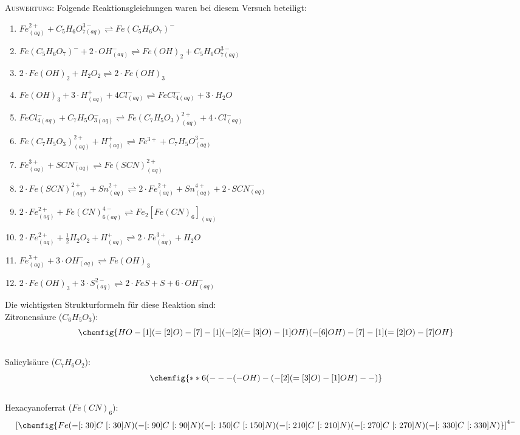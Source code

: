 \documentclass[11pt, a4paper]{article}
\begin{document}
\textsc{Auswertung:}\hspace{8mm} Folgende Reaktionsgleichungen waren bei diesem Versuch beteiligt:\\
\begin{enumerate}
\item $Fe^{2+}_{(aq)} + C_5H_6O^{3-}_{7(aq)} \rightleftharpoons Fe(C_5H_6O_7)^-$
\item $Fe(C_5H_6O_7)^- + 2\cdot OH^-_{(aq)} \rightleftharpoons Fe(OH)_2 + C_5H_6O^{3-}_{7(aq)}$
\item $2\cdot Fe(OH)_2 + H_2O_2 \rightleftharpoons 2\cdot Fe(OH)_3$
\item $Fe(OH)_3 + 3\cdot H^+_{(aq)} + 4Cl^-_{(aq)}  \rightleftharpoons FeCl^-_{4(aq)} + 3\cdot H_2O$
\item $FeCl^-_{4(aq)} + C_7H_5O^-_{3(aq)} \rightleftharpoons Fe(C_7H_5O_3)^{2+}_{(aq)} + 4\cdot Cl^-_{(aq)}$
\item $Fe(C_7H_5O_3)^{2+}_{(aq)} + H^+_{(aq)} \rightleftharpoons Fe^{3+} + C_7H_5O^{3-}_{(aq)}$
\item $Fe^{3+}_{(aq)} + SCN^-_{(aq)} \rightleftharpoons Fe(SCN)^{2+}_{(aq)}$
\item $2\cdot Fe(SCN)^{2+}_{(aq)} + Sn^{2+}_{(aq)} \rightleftharpoons 2\cdot Fe^{2+}_{(aq)} + Sn^{4+}_{(aq)} + 2\cdot SCN^-_{(aq)}$
\item $2\cdot Fe^{2+}_{(aq)} + Fe(CN)^{4-}_{6 (aq)} \rightleftharpoons Fe_2[Fe(CN)_6]_{(aq)}$                                              
\item $2\cdot Fe^{2+}_{(aq)} + \frac{1}{2}H_2O_2 + H^+_{(aq)} \rightleftharpoons 2\cdot Fe^{3+}_{(aq)} + H_2O$
\item $Fe^{3+}_{(aq)} + 3\cdot OH^-_{(aq)} \rightleftharpoons Fe(OH)_3$
\item $2\cdot Fe(OH)_3 + 3\cdot S^{2-}_{(aq)} \rightleftharpoons 2\cdot FeS + S + 6\cdot OH^-_{(aq)} $
\end{enumerate}
Die wichtigsten Strukturformeln für diese Reaktion sind:\\

Zitronensäure ($C_6H_5O_3$):\\
$$\chemfig{HO-[1](=[2]O)-[7]-[1](-[2](=[3]O)-[1]OH)(-[6]OH)-[7]-[1](=[2]O)-[7]OH}$$ \\ %

Salicylsäure ($C_7H_6O_2$):\\
$$\chemfig{**6(---(-OH)-(-[2](=[3]O)-[1]OH)--)}$$\\ %

Hexacyanoferrat ($Fe(CN)_6$):\\
$$\left[\chemfig{Fe(-[:30]C~[:30]N)(-[:90]C~[:90]N)(-[:150]C~[:150]N)(-[:210]C~[:210]N)(-[:270]C~[:270]N)(-[:330]C~[:330]N)}\right]^{4-}$$\\ %
\end{document}
